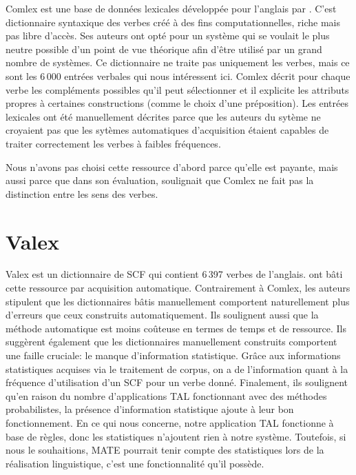 Comlex est une base de données lexicales développée pour l'anglais par \cite{Grishman:1994:CSB:991886.991931}. C'est dictionnaire syntaxique des verbes créé à des fins computationnelles, riche mais pas libre d'accès. Ses auteurs ont opté pour un système qui se voulait le plus neutre possible d'un point de vue théorique afin d'être utilisé par un grand nombre de systèmes. Ce dictionnaire ne traite pas uniquement les verbes, mais ce sont les 6\,000 entrées verbales qui nous intéressent ici. Comlex décrit pour chaque verbe les compléments possibles qu'il peut sélectionner et il explicite les attributs propres à certaines constructions (comme le choix d'une préposition). Les entrées lexicales ont été manuellement décrites parce que les auteurs du sytème ne croyaient pas que les sytèmes automatiques d'acquisition étaient capables de traiter correctement les verbes à faibles fréquences.

Nous n'avons pas choisi cette ressource d'abord parce qu'elle est payante, mais aussi parce que dans son évaluation, \cite{SchulerVerbnetBroadcoverageComprehensive2005} soulignait que Comlex ne fait pas la distinction entre les sens des verbes.

\section{Valex}
 
Valex \citep{Korhonenlargesubcategorizationlexicon2006}  est un dictionnaire de \ac{SCF} qui contient 6\,397 verbes de l'anglais. \citeauthor{Korhonenlargesubcategorizationlexicon2006} ont bâti cette ressource par acquisition automatique. Contrairement à Comlex, les auteurs stipulent que les dictionnaires bâtis manuellement comportent naturellement plus d'erreurs que ceux construits automatiquement. Ils soulignent aussi que la méthode automatique est moins coûteuse en termes de temps et de ressource. Ils suggèrent également que les dictionnaires manuellement construits comportent une faille cruciale: le manque d'information statistique. Grâce aux informations statistiques acquises via le traitement de corpus, on a de l'information quant à la fréquence d'utilisation d'un \ac{SCF} pour un verbe donné. Finalement, ils soulignent qu'en raison du nombre d'applications \ac{TAL} fonctionnant avec des méthodes probabilistes, la présence d'information statistique ajoute à leur bon fonctionnement. En ce qui nous concerne, notre application \ac{TAL} fonctionne à base de règles, donc les statistiques n'ajoutent rien à notre système. Toutefois, si nous le souhaitions, MATE \citep{BohnetDevelopmentEnvironmentMTTbased2000a,BOHNET10,bohnet07} pourrait tenir compte des statistiques lors de la réalisation linguistique, c'est une fonctionnalité qu'il possède.

